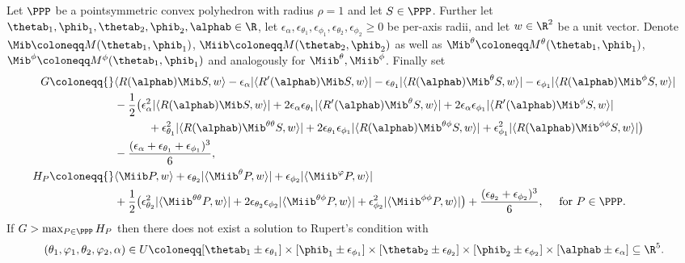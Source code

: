\begin{theorem} \label{thm:global}
\leanok
    Let $\PPP$ be a pointsymmetric convex polyhedron with radius $\rho =1$ and let $S \in \PPP$. Further let $\thetab_1,\phib_1,\thetab_2,\phib_2,\alphab \in \R$, let
    $\epsilon_\alpha, \epsilon_{\theta_1}, \epsilon_{\phi_1}, \epsilon_{\theta_2}, \epsilon_{\phi_2} \geq 0$
    be per-axis radii, and let $w\in\R^2$ be a unit vector. Denote $\Mib \coloneqq M(\thetab_1, \phib_1)$, $ \Miib \coloneqq M(\thetab_2, \phib_2)$ as well as $\Mib^{\theta} \coloneqq M^\theta(\thetab_1, \phib_1)$, $\Mib^{\phi} \coloneqq M^\phi(\thetab_1, \phib_1)$ and analogously for $\Miib^{\theta}, \Miib^{\phi}$. Finally set
    \begin{align*}
        G \coloneqq{}& \langle R(\alphab) \Mib S,w \rangle - \epsilon_\alpha|\langle R'(\alphab)  \Mib S,w \rangle| - \epsilon_{\theta_1}|\langle R(\alphab) \Mib^\theta S,w \rangle| - \epsilon_{\phi_1}|\langle R(\alphab) \Mib^\phi S,w \rangle|\\
        &- \frac{1}{2}\big(\epsilon_\alpha^2|\langle R(\alphab) \Mib S,w \rangle|
          + 2\epsilon_\alpha\epsilon_{\theta_1}|\langle R'(\alphab) \Mib^\theta S,w \rangle| + 2\epsilon_\alpha\epsilon_{\phi_1}|\langle R'(\alphab) \Mib^\phi S,w \rangle|\\
        &\qquad\quad + \epsilon_{\theta_1}^2|\langle R(\alphab) \Mib^{\theta\theta} S,w \rangle| + 2\epsilon_{\theta_1}\epsilon_{\phi_1}|\langle R(\alphab) \Mib^{\theta\phi} S,w \rangle| + \epsilon_{\phi_1}^2|\langle R(\alphab) \Mib^{\phi\phi} S,w \rangle|\big)\\
        &- \frac{(\epsilon_\alpha+\epsilon_{\theta_1}+\epsilon_{\phi_1})^3}{6},\\
        H_P \coloneqq{}& \langle \Miib P,w \rangle + \epsilon_{\theta_2}|\langle \Miib^\theta P,w \rangle|+\epsilon_{\phi_2}|\langle  \Miib^\varphi P,w \rangle|\\
        &+ \frac{1}{2}\big(\epsilon_{\theta_2}^2|\langle \Miib^{\theta\theta} P,w \rangle| + 2\epsilon_{\theta_2}\epsilon_{\phi_2}|\langle \Miib^{\theta\phi} P,w \rangle| + \epsilon_{\phi_2}^2|\langle \Miib^{\phi\phi} P,w \rangle|\big) + \frac{(\epsilon_{\theta_2}+\epsilon_{\phi_2})^3}{6}, \quad \text{ for } P \in \PPP.
    \end{align*}
    If $G>\max_{P\in \PPP} H_P$ then there does not exist a solution to Rupert's condition with
    $$(\theta_1,\varphi_1,\theta_2,\varphi_2,\alpha) \in U \coloneqq [\thetab_1\pm\epsilon_{\theta_1}]\times[\phib_1\pm\epsilon_{\phi_1}]\times[\thetab_2\pm\epsilon_{\theta_2}]\times[\phib_2\pm\epsilon_{\phi_2}]\times[\alphab\pm\epsilon_\alpha] \subseteq \R^5.$$


\end{theorem}
